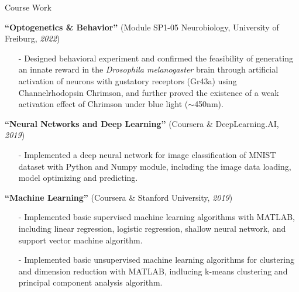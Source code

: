 \begin{rSection}{Course Work}

    \textbf{``Optogenetics \& Behavior''} (Module SP1-05 Neurobiology, University of Freiburg, \textit{2022})
    \begin{itemize}
        \item[-] Designed behavioral experiment and confirmed the feasibility of generating an innate reward in the \textit{Drosophila melanogaster} brain through artificial activation of neurons with gustatory receptors (Gr43a) using Channelrhodopsin Chrimson, and further proved the existence of a weak activation effect of Chrimson under blue light ($\sim$450nm).
    \end{itemize}
    
    \textbf{``Neural Networks and Deep Learning''} (Coursera \& DeepLearning.AI, \textit{2019})
    \begin{itemize}
        \item[-] Implemented a deep neural network for image classification of MNIST dataset with Python and Numpy module, including the image data loading, model optimizing and predicting.
    \end{itemize}
    
    \textbf{``Machine Learning''} (Coursera \& Stanford University, \textit{2019})
    \begin{itemize}
        \item[-] Implemented basic supervised machine learning algorithms with MATLAB, including linear regression, logistic regression, shallow neural network, and support vector machine algorithm.
        \item[-] Implemented basic unsupervised machine learning algorithms for clustering and dimension reduction with MATLAB, indlucing k-means clustering and principal component analysis algorithm.
    \end{itemize}
    
\end{rSection}
